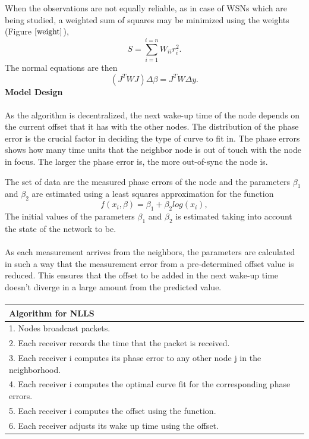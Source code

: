 \documentclass[a4paper,10pt]{report}
\begin{document}
When the observations are not equally reliable, as in case of WSNs
which are being studied, a weighted sum of squares may be minimized
using the weights (Figure $\ref{weight}$),
\begin{equation}
    S=\sum_{i=1}^{i=n}W_{ii}r_i^2.
\end{equation}
The normal equations are then
\begin{equation}
    \left(J^TWJ\right)\Delta  \beta=J^TW\Delta y.
\end{equation}
\textbf{Model Design}\paragraph*{}
As the algorithm is decentralized, the next wake-up time of the node depends on the current offset that it has with the other nodes. The distribution of the phase error is the crucial factor in deciding the type of curve to fit in. The phase errors shows how many time units that the neighbor node is out of touch with the node in focus. The larger the phase error is, the more out-of-sync the node is.\par
The set of data are the measured phase errors of the node and the parameters $\beta_1$ and $\beta_2$ are estimated using a least squares approximation for the function
\begin{equation}
 f(x_i,\beta)= \beta _1 + \beta_2log(x_i),
\end{equation}
The initial values of the parameters $\beta_1$ and $\beta_2$ is estimated taking into account
the state of the network to be. \paragraph*{}
As each measurement arrives from the neighbors, the parameters are calculated in such a way that the measurement error from a pre-determined offset value is reduced. This ensures that the offset to be added in the next wake-up time doesn't diverge in a large amount from the predicted value.
\paragraph*{}
\begin{tabular}{  l }Algorithm for NLLS \\\hline \hline
1. Nodes broadcast packets. \\  2. Each receiver records the time that the packet is received. \\
3. Each receiver i computes its phase error to any other node j in the neighborhood. \\
4. Each receiver i computes the optimal curve fit for the corresponding phase errors. \\
5. Each receiver i computes the offset using the function. \\
6. Each receiver adjusts its wake up time using the offset.\\
\hline \hline
\end{tabular}
\end{document}
